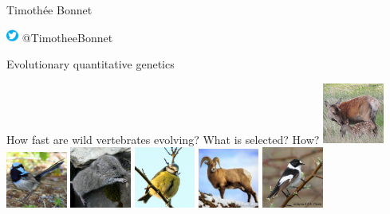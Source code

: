\documentclass[10pt]{beamer}%
\title[]{}
\date{March 22, 2017}
\author[\footnotesize Timoth\'ee Bonnet ]{ }
\begin{document}
\begin{frame}{Timoth\'ee Bonnet}

\vfill
\includegraphics[width=0.03\textwidth]{Figures/tweeter.jpeg} @TimotheeBonnet
\end{frame}
\begin{frame}{Evolutionary quantitative genetics}
   
    \begin{alertblock}{How fast are wild vertebrates evolving? What is selected? How?}
    \centering
        \includegraphics[width=0.15\textwidth]{Figures/doe}
        \includegraphics[width=0.15\textwidth]{Figures/sfw}
        \includegraphics[width=0.15\textwidth]{Figures/vole}
        \includegraphics[width=0.15\textwidth]{Figures/bt}
        \includegraphics[width=0.15\textwidth]{Figures/bgs}
        \includegraphics[width=0.15\textwidth]{Figures/cfc}
    \end{alertblock}
    

\end{frame}
\end{document}
